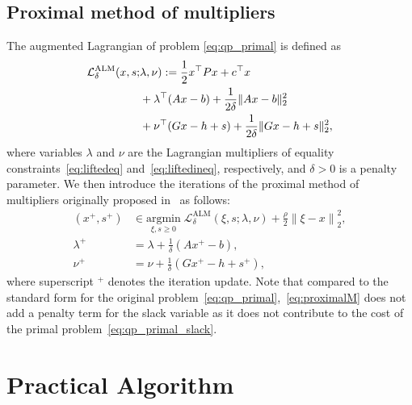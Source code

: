 \documentclass[letterpaper, 10 pt, conference]{ieeeconf}  \IEEEoverridecommandlockouts
\begin{document}
\subsection{Proximal method of multipliers}
The augmented Lagrangian of problem \eqref{eq:qp_primal} is defined as
\begin{align}\notag
\label{eq:AL}
\mathcal{L}^\text{ALM}_{\delta}(x,s;& \lambda,\nu) := \frac{1}{2} x^\top P x + c^\top x\\\notag
&+\lambda^\top (A x-b)+\frac{1}{2 \delta}\|A x-b\|_2^2 \\
&+\nu^\top (Gx-h+s)+\frac{1}{2 \delta}\|Gx-h+s\|_2^2,
\end{align}
where variables $\lambda$ and $\nu$ are the Lagrangian multipliers of equality constraints~\eqref{eq:liftedeq} and~\eqref{eq:liftedineq}, respectively, and $\delta>0$ is a penalty parameter. We then introduce the iterations of the proximal method of multipliers originally proposed in~\cite{rockafellar1976} as follows:
\begin{subequations}
\label{eq:proximalM}
\begin{align}\label{eq:PMM_sub_prob}
(x^+,s^+) & \in \underset{\xi,s\geq 0}{\text{argmin}}\;\mathcal{L}^\text{ALM}_{\delta}(\xi,s;\lambda,\nu)+ \frac{\rho}{2}\left\|\xi-x\right\|_2^2,  \\\label{eq:lamupdate}
\lambda^+ & = \lambda+\frac{1}{\delta}\left(A x^+-b\right), \\\label{eq:nuupdate}
\nu^+ & = \nu+\frac{1}{\delta}\left(G x^+-h+s^+\right),
\end{align}
\end{subequations}
where superscript $^+$ denotes the iteration update.
Note that compared to the standard form for the original problem~\eqref{eq:qp_primal},~\eqref{eq:proximalM} does not add a penalty term for the slack variable as it does not contribute to the cost of the primal problem~\eqref{eq:qp_primal_slack}.

\section{Practical Algorithm}
\label{sec:pipm}
\end{document}
